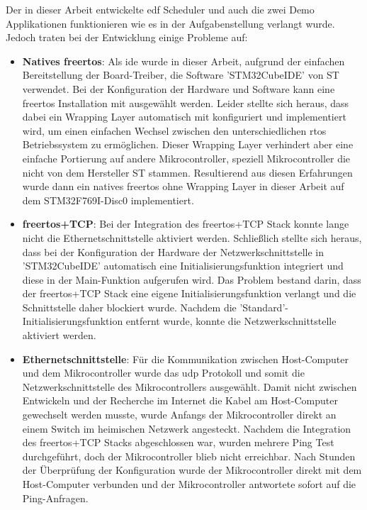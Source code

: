 \documentclass[../EDF Master Thesis.tex]{subfiles}
\begin{document}
    Der in dieser Arbeit entwickelte \ac{edf} Scheduler und auch die zwei Demo Applikationen funktionieren wie es in der Aufgabenstellung verlangt wurde.
    Jedoch traten bei der Entwicklung einige Probleme auf:
    \begin{itemize}
        \item \textbf{Natives \ac{freertos}}: Als \ac{ide} wurde in dieser Arbeit, aufgrund der einfachen Bereitstellung der Board-Treiber, die Software 'STM32CubeIDE' von ST verwendet.
            Bei der Konfiguration der Hardware und Software kann eine \ac{freertos} Installation mit ausgewählt werden.
            Leider stellte sich heraus, dass dabei ein Wrapping Layer automatisch mit konfiguriert und implementiert wird, um einen einfachen Wechsel zwischen den unterschiedlichen \ac{rtos} Betriebssystem zu ermöglichen.
            Dieser Wrapping Layer verhindert aber eine einfache Portierung auf andere Mikrocontroller, speziell Mikrocontroller die nicht von dem Hersteller ST stammen.
            Resultierend aus diesen Erfahrungen wurde dann ein natives \ac{freertos} ohne Wrapping Layer in dieser Arbeit auf dem STM32F769I-Disc0 implementiert.
        \item \textbf{\ac{freertos}+TCP}: Bei der Integration des \ac{freertos}+TCP Stack konnte lange nicht die Ethernetschnittstelle aktiviert werden.
            Schließlich stellte sich heraus, dass bei der Konfiguration der Hardware der Netzwerkschnittstelle in 'STM32CubeIDE' automatisch eine Initialisierungsfunktion integriert und diese in der Main-Funktion aufgerufen wird.
            Das Problem bestand darin, dass der \ac{freertos}+TCP Stack eine eigene Initialisierungsfunktion verlangt und die Schnittstelle daher blockiert wurde.
            Nachdem die 'Standard'-Initialisierungsfunktion entfernt wurde, konnte die Netzwerkschnittstelle aktiviert werden.
        \item \textbf{Ethernetschnittstelle}: Für die Kommunikation zwischen Host-Computer und dem Mikrocontroller wurde das \ac{udp} Protokoll und somit die Netzwerkschnittstelle des Mikrocontrollers ausgewählt.
            Damit nicht zwischen Entwickeln und der Recherche im Internet die Kabel am Host-Computer gewechselt werden musste, wurde Anfangs der Mikrocontroller direkt an einem Switch im heimischen Netzwerk angesteckt.
            Nachdem die Integration des \ac{freertos}+TCP Stacks abgeschlossen war, wurden mehrere Ping Test durchgeführt, doch der Mikrocontroller blieb nicht erreichbar.
            Nach Stunden der Überprüfung der Konfiguration wurde der Mikrocontroller direkt mit dem Host-Computer verbunden und der Mikrocontroller antwortete sofort auf die Ping-Anfragen.

\end{itemize}
\end{document}
